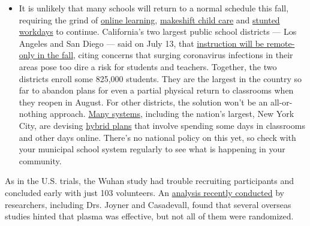 \begin{itemize}
  \begin{itemize}
  \tightlist
  \item
    It is unlikely that many schools will return to a normal schedule
    this fall, requiring the grind of
    \href{https://www.nytimes.com/2020/06/05/us/coronavirus-education-lost-learning.html?action=click\&pgtype=Article\&state=default\&region=MAIN_CONTENT_3\&context=storylines_faq}{online
    learning},
    \href{https://www.nytimes.com/2020/05/29/us/coronavirus-child-care-centers.html?action=click\&pgtype=Article\&state=default\&region=MAIN_CONTENT_3\&context=storylines_faq}{makeshift
    child care} and
    \href{https://www.nytimes.com/2020/06/03/business/economy/coronavirus-working-women.html?action=click\&pgtype=Article\&state=default\&region=MAIN_CONTENT_3\&context=storylines_faq}{stunted
    workdays} to continue. California's two largest public school
    districts --- Los Angeles and San Diego --- said on July 13, that
    \href{https://www.nytimes.com/2020/07/13/us/lausd-san-diego-school-reopening.html?action=click\&pgtype=Article\&state=default\&region=MAIN_CONTENT_3\&context=storylines_faq}{instruction
    will be remote-only in the fall}, citing concerns that surging
    coronavirus infections in their areas pose too dire a risk for
    students and teachers. Together, the two districts enroll some
    825,000 students. They are the largest in the country so far to
    abandon plans for even a partial physical return to classrooms when
    they reopen in August. For other districts, the solution won't be an
    all-or-nothing approach.
    \href{https://bioethics.jhu.edu/research-and-outreach/projects/eschool-initiative/school-policy-tracker/}{Many
    systems}, including the nation's largest, New York City, are
    devising
    \href{https://www.nytimes.com/2020/06/26/us/coronavirus-schools-reopen-fall.html?action=click\&pgtype=Article\&state=default\&region=MAIN_CONTENT_3\&context=storylines_faq}{hybrid
    plans} that involve spending some days in classrooms and other days
    online. There's no national policy on this yet, so check with your
    municipal school system regularly to see what is happening in your
    community.
  \end{itemize}
\end{itemize}

As in the U.S. trials, the Wuhan study had trouble recruiting
participants and concluded early with just 103 volunteers. An
\href{https://www.medrxiv.org/content/10.1101/2020.07.29.20162917v1.full.pdf}{analysis
recently conducted} by researchers, including Drs. Joyner and
Casadevall, found that several overseas studies hinted that plasma was
effective, but not all of them were randomized.

